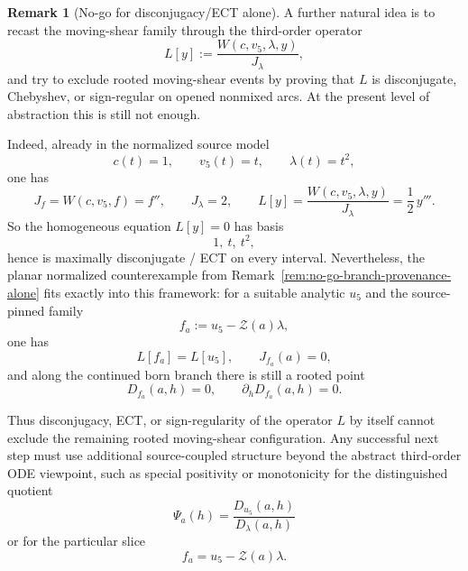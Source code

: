 \documentclass[11pt,a4paper]{amsart}
\theoremstyle{plain}
\theoremstyle{definition}
\newtheorem{remark}[theorem]{Remark}
\begin{document}
\begin{remark}[No-go for disconjugacy/ECT alone]
\label{rem:no-go-disconjugacy-alone}
A further natural idea is to recast the moving-shear family through the
third-order operator
\[
L[y]:=\frac{W(c,v_5,\lambda,y)}{J_\lambda},
\]
and try to exclude rooted moving-shear events by proving that $L$ is
disconjugate, Chebyshev, or sign-regular on opened nonmixed arcs.
At the present level of abstraction this is still not enough.

Indeed, already in the normalized source model
\[
c(t)=1,\qquad v_5(t)=t,\qquad \lambda(t)=t^2,
\]
one has
\[
J_f=W(c,v_5,f)=f'',
\qquad
J_\lambda=2,
\qquad
L[y]=\frac{W(c,v_5,\lambda,y)}{J_\lambda}=\frac12\,y'''.
\]
So the homogeneous equation $L[y]=0$ has basis
\[
1,\ t,\ t^2,
\]
hence is maximally disconjugate / ECT on every interval. Nevertheless, the
planar normalized counterexample from
Remark~\ref{rem:no-go-branch-provenance-alone}
fits exactly into this framework: for a suitable analytic $u_5$ and the
source-pinned family
\[
f_a:=u_5-\mathcal Z(a)\lambda,
\]
one has
\[
L[f_a]=L[u_5],
\qquad
J_{f_a}(a)=0,
\]
and along the continued born branch there is still a rooted point
\[
D_{f_a}(a,h)=0,
\qquad
\partial_h D_{f_a}(a,h)=0.
\]

Thus disconjugacy, ECT, or sign-regularity of the operator $L$ by itself
cannot exclude the remaining rooted moving-shear configuration. Any successful
next step must use additional source-coupled structure beyond the abstract
third-order ODE viewpoint, such as special positivity or monotonicity for the
distinguished quotient
\[
\Psi_a(h)=\frac{D_{u_5}(a,h)}{D_\lambda(a,h)}
\]
or for the particular slice
\[
f_a=u_5-\mathcal Z(a)\lambda.
\]
\end{remark}
\end{document}
